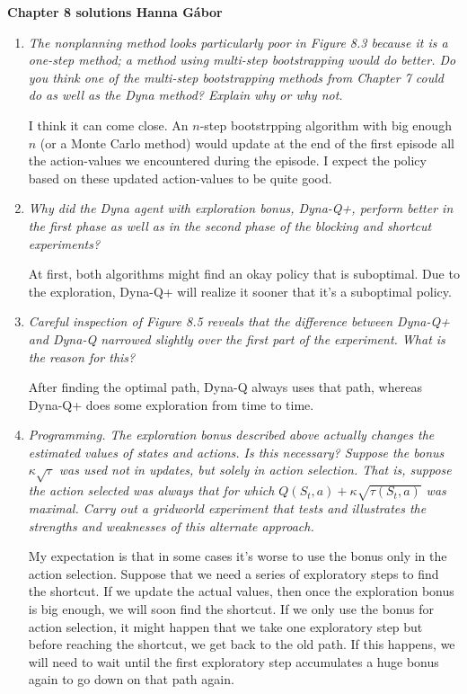 \documentclass[12pt,a4paper]{article}
\begin{document}
\textbf{Chapter 8 solutions  \hfill Hanna Gábor}

\begin{enumerate}
  \item
    \textit{The nonplanning method looks particularly poor in Figure 8.3 because it is
    a one-step method; a method using multi-step bootstrapping would do better. Do you
    think one of the multi-step bootstrapping methods from Chapter 7 could do as well as
    the Dyna method? Explain why or why not.}

    I think it can come close. An $n$-step bootstrpping algorithm with big enough $n$ (or a
    Monte Carlo method) would update at the end of the first episode all the action-values we
    encountered during the episode.
    I expect the policy based on these updated action-values to be quite good.

  \item
    \textit{Why did the Dyna agent with exploration bonus, Dyna-Q+, perform
    better in the first phase as well as in the second phase of the blocking and shortcut
    experiments?}

    At first, both algorithms might find an okay policy that is suboptimal. Due
    to the exploration, Dyna-Q+ will realize it sooner that it's a suboptimal policy.

  \item
    \textit{Careful inspection of Figure 8.5 reveals that the difference between Dyna-Q+
    and Dyna-Q narrowed slightly over the first part of the experiment. What is the reason
    for this?}

    After finding the optimal path, Dyna-Q always uses that path, whereas Dyna-Q+
    does some exploration from time to time.

  \item
    \textit{Programming. The exploration bonus described above actually changes
    the estimated values of states and actions. Is this necessary? Suppose the bonus
    $\kappa \sqrt{\tau}$ was used not in updates, but solely in action selection.
    That is, suppose the action selected was always that for which $Q(S_t, a) +
    \kappa \sqrt{\tau (S_t, a)}$ was maximal. Carry out a gridworld experiment
    that tests and illustrates the strengths and weaknesses of this alternate approach.}

    My expectation is that in some cases it's worse to use the bonus only in the
    action selection. Suppose that we need a series of exploratory steps to find
    the shortcut. If we update the actual values, then once the exploration bonus
    is big enough, we will soon find the shortcut. If we only use the bonus for action
    selection, it might happen that we take one exploratory step but before reaching the
    shortcut, we get back to the old path. If this happens, we will need to wait until
    the first exploratory step accumulates a huge bonus again to go down on that
    path again.


\end{enumerate}
\end{document}
